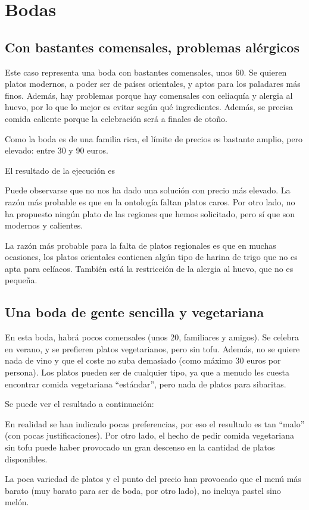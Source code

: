 % 

\section{Bodas}

\subsection{Con bastantes comensales, problemas alérgicos}
Este caso representa una boda con bastantes comensales, unos 60. Se quieren
platos modernos, a poder ser de países orientales, y aptos para los paladares
más finos. Además, hay problemas porque hay comensales con celiaquía y alergia
al huevo, por lo que lo mejor es evitar según qué ingredientes. Además, se
precisa comida caliente porque la celebración será a finales de otoño.

Como la boda es de una familia rica, el límite de precios es bastante amplio,
pero elevado: entre 30 y 90 euros.

El resultado de la ejecución es


Puede observarse que no nos ha dado una solución con precio más elevado. La
razón más probable es que en la ontología faltan platos caros. Por otro lado,
no ha propuesto ningún plato de las regiones que hemos solicitado, pero sí que
son modernos y calientes.

La razón más probable para la falta de platos regionales es que en muchas
ocasiones, los platos orientales contienen algún tipo de harina de trigo que no
es apta para celíacos. También está la restricción de la alergia al huevo, que
no es pequeña.

\subsection{Una boda de gente sencilla y vegetariana}
En esta boda, habrá pocos comensales (unos 20, familiares y amigos). Se celebra
en verano, y se prefieren platos vegetarianos, pero sin tofu. Además, no se
quiere nada de vino y que el coste no suba demasiado (como máximo 30 euros por
persona). Los platos pueden ser de cualquier tipo, ya que a menudo les cuesta
encontrar comida vegetariana ``estándar'', pero nada de platos para sibaritas.

Se puede ver el resultado a continuación:


En realidad se han indicado pocas preferencias, por eso el resultado es tan
``malo'' (con pocas justificaciones). Por otro lado, el hecho de pedir comida
vegetariana sin tofu puede haber provocado un gran descenso en la cantidad de
platos disponibles.

La poca variedad de platos y el punto del precio han provocado que el menú más
barato (muy barato para ser de boda, por otro lado), no incluya pastel sino
melón.
